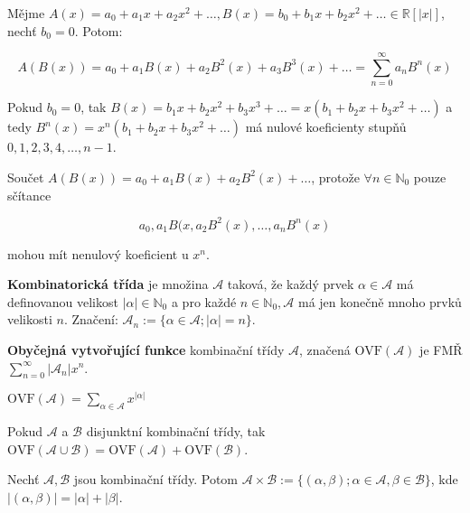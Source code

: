 \begin{definice}
	Mějme $A(x) = a_{0} + a_{1}x + a_{2}x^{2} + \dots, B(x) = b_{0} + b_{1} x + b_{2} x^{2} + \dots \in \mathbb{R}[|x|]$, nechť $b_{0} = 0$. Potom:
	
	$$
	A(B(x)) = a_{0} + a_{1}B(x) + a_{2}B^{2}(x) + a_{3}B^{3}(x) + \dots = \sum_{n = 0}^{\infty}a_{n}B^{n}(x)
	$$
\end{definice}

\begin{pozn}
	Pokud $b_{0} =0$, tak $B(x) = b_{1}x + b_{2}x^{2} + b_{3}x^{3} + \dots = x (b_{1} + b_{2} x + b_{3} x^{2} + \dots)$ a tedy $B^{n}(x) = x^{n}(b_{1} + b_{2} x + b_{3} x^{2} + \dots)$ má nulové koeficienty stupňů $0,1,2,3,4, \dots, n-1$.
\end{pozn}

Součet $A(B(x)) = a_{0} + a_{1}B(x) + a_{2}B^{2}(x) + \dots$, protože $\forall n \in \mathbb{N}_{0}$ pouze sčítance 

$$
a_{0}, a_{1}B(x, a_{2} B^{2}(x), \dots, a_{n}B^{n}(x)
$$

\noindent mohou mít nenulový koeficient u $x^{n}$.

\begin{definice}
	\textbf{Kombinatorická třída} je množina $\mathcal{A}$ taková, že každý prvek $\alpha \in \mathcal{A}$ má definovanou velikost $|\alpha| \in \mathbb{N}_{0}$ a pro každé $n \in \mathbb{N}_{0}, \mathcal{A}$ má jen konečně mnoho prvků velikosti $n$. Značení: $\mathcal{A}_{n}:=\{\alpha \in \mathcal{A}; |\alpha| = n\}$.
\end{definice}

\begin{definice}
	\textbf{Obyčejná vytvořující funkce} kombinační třídy $\mathcal{A}$, značená $\text{OVF}(\mathcal{A})$ je FMŘ $\sum_{n = 0}^{\infty} |\mathcal{A}_{n}|x^{n}$.
\end{definice}

\begin{pozor}
	$\text{OVF}(\mathcal{A}) = \sum_{\alpha \in \mathcal{A}} x^{|\alpha|}$
\end{pozor}

\begin{pozor}
	Pokud $\mathcal{A}$ a $\mathcal{B}$ disjunktní kombinační třídy, tak $\text{OVF}(\mathcal{A} \cup \mathcal{B}) = \text{OVF}(\mathcal{A}) + \text{OVF}(\mathcal{B})$.
\end{pozor}

\begin{definice}
	Nechť $\mathcal{A}, \mathcal{B}$ jsou kombinační třídy. Potom $\mathcal{A} \times \mathcal{B} := \{(\alpha,\beta); \alpha \in \mathcal{A}, \beta \in \mathcal{B}\}$, kde $|(\alpha, \beta)| = |\alpha| + |\beta|$.
\end{definice}

